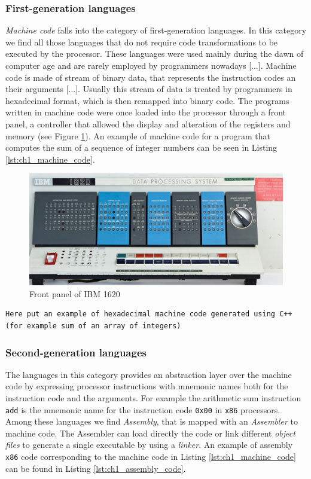 \subsubsection*{First-generation languages}
\textit{Machine code} falls into the category of first-generation languages. In this category we find all those languages that do not require code transformations to be executed by the processor. These languages were used mainly during the dawn of computer age and are rarely employed by programmers nowadays [...]. Machine code is made of stream of binary data, that represents the instruction codes an their arguments [...]. Usually this stream of data is treated by programmers in hexadecimal format, which is then remapped into binary code. The programs written in machine code were once loaded into the processor through a front panel, a controller that allowed the display and alteration of the registers and memory (see Figure \ref{fig:ch1_front_panel}). An example of machine code for a program that computes the sum of a sequence of integer numbers can be seen in Listing \ref{lst:ch1_machine_code}.

\begin{figure}
	\centering
	\includegraphics[width = \textwidth]{Figures/ch1_front_panel}
	\caption{Front panel of IBM 1620}
	\label{fig:ch1_front_panel}
\end{figure}


\begin{lstlisting}[caption = Machine code to compute the sum of a sequence of numbers, label = lst:ch1_machine_code]
Here put an example of hexadecimal machine code generated using C++ (for example sum of an array of integers)
\end{lstlisting}

\subsubsection*{Second-generation languages}
The languages in this category provides an abstraction layer over the machine code by expressing processor instructions with mnemonic names both for the instruction code and the arguments. For example the arithmetic sum instruction \texttt{add} is the mnemonic name for the instruction code \texttt{0x00} in \texttt{x86} processors. Among these languages we find \textit{Assembly}, that is mapped with an \textit{Assembler} to machine code. The Assembler can load directly the code or link different \textit{object files} to generate a single executable by using a \textit{linker}. An example of assembly \texttt{x86} code corresponding to the machine code in Listing \ref{lst:ch1_machine_code} can be found in Listing \ref{lst:ch1_assembly_code}.

